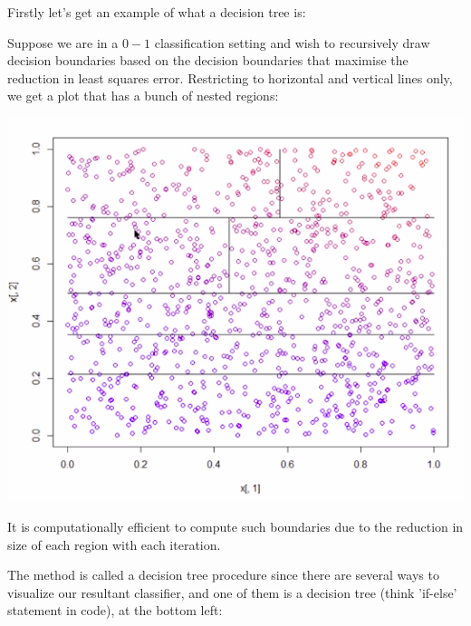 \documentclass[11pt]{scrartcl}
\begin{document}
Firstly let's get an example of what a decision tree is:

\begin{example}

Suppose we are in a $0-1$ classification setting and wish to recursively draw decision boundaries based on the decision boundaries that maximise the reduction in least squares error. Restricting to horizontal and vertical lines only, we get a plot that has a bunch of nested regions:

\begin{center}
\includegraphics[scale=0.5]{multiple boundaries.png}
\end{center}

It is computationally efficient to compute such boundaries due to the reduction in size of each region with each iteration.

The method is called a decision tree procedure since there are several ways to visualize our resultant classifier, and one of them is a decision tree (think 'if-else' statement in code), at the bottom left:


\end{example}
\end{document}

